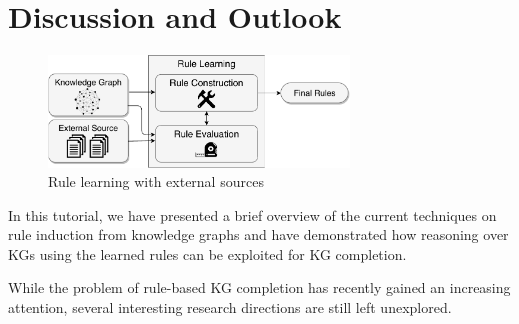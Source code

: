 \section{Discussion and Outlook}\label{sec:disc}

\begin{figure}[t]
\centering
\includegraphics[width=8cm]{figures/discussion_overview}
\caption{Rule learning with external sources}
\label{fig:discussion_overview}
\end{figure}

In this tutorial, we have presented a brief overview of the current techniques on rule induction from knowledge graphs and have demonstrated how reasoning over KGs using the learned rules  can be exploited for KG completion. %

While the problem of rule-based KG completion has recently gained an increasing attention, several interesting research directions are still left unexplored. %


